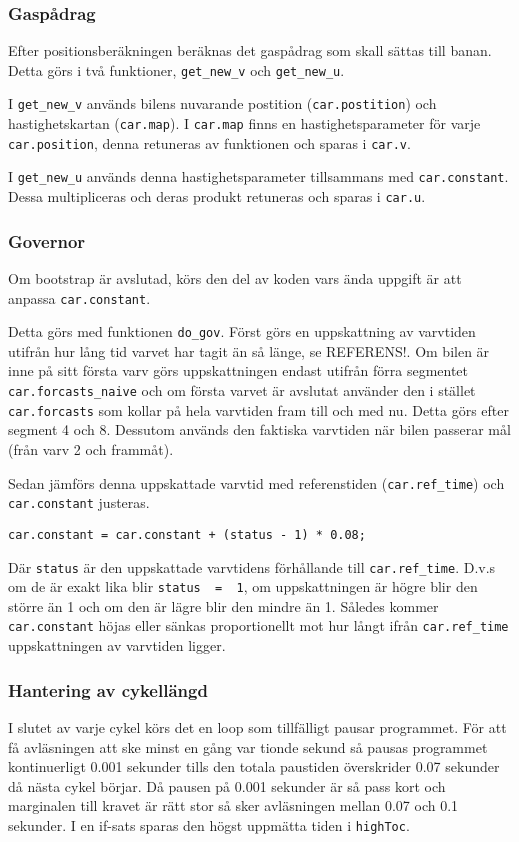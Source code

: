 \subsubsection{Gaspådrag}

Efter positionsberäkningen beräknas det gaspådrag som skall sättas till banan. Detta görs i två
funktioner, \texttt{get\_new\_v} och \texttt{get\_new\_u}.
 
I \texttt{get\_new\_v} används bilens nuvarande postition (\texttt{car.postition})
och hastighetskartan (\texttt{car.map}). I \texttt{car.map} finns en
hastighetsparameter för varje \texttt{car.position}, denna retuneras av funktionen
och sparas i \texttt{car.v}.
 
I \texttt{get\_new\_u} används denna hastighetsparameter tillsammans med
\texttt{car.constant}. Dessa multipliceras och deras produkt retuneras och sparas
i \texttt{car.u}.

\subsubsection{Governor}
\label{sec:systembeskrivning:governor}
Om bootstrap är avslutad, körs den del av koden vars ända uppgift är att 
anpassa \texttt{car.constant}. 

Detta görs med funktionen \texttt{do\_gov}.  Först görs en uppskattning av 
varvtiden utifrån hur lång tid varvet har tagit än
så länge, se REFERENS!. Om bilen är inne på sitt första varv görs uppskattningen endast
utifrån förra segmentet \texttt{car.forcasts\_naive} och om första varvet är
avslutat använder den i stället \texttt{car.forcasts} som kollar på hela varvtiden
fram till och med nu. Detta görs efter segment 4 och 8. Dessutom används den
faktiska varvtiden när bilen passerar mål (från varv 2 och frammåt).
 
Sedan jämförs denna uppskattade varvtid med referenstiden (\texttt{car.ref\_time}) 
och \texttt{car.constant} justeras.
\begin{verbatim}
car.constant = car.constant + (status - 1) * 0.08;
\end{verbatim}
Där \texttt{status} är den uppskattade varvtidens förhållande till \texttt{car.ref\_time}.
D.v.s om de är exakt lika blir \texttt{status~ =~ 1}, om uppskattningen är högre blir
den större än 1 och om den är lägre blir den mindre än 1. Således kommer \texttt{car.constant}
höjas eller sänkas proportionellt mot hur långt ifrån \texttt{car.ref\_time} uppskattningen
av varvtiden ligger. 

\subsubsection{Hantering av cykellängd}
\label{sec:system:korning:cykel}
I slutet av varje cykel körs det en loop som tillfälligt pausar programmet.
För att få avläsningen att ske minst en gång var tionde sekund så pausas
programmet kontinuerligt 0.001 sekunder tills den totala paustiden överskrider 
0.07 sekunder då nästa cykel börjar. Då pausen på 0.001 sekunder är så pass
kort och marginalen till kravet är rätt stor så sker avläsningen mellan
0.07 och 0.1 sekunder. I en if-sats sparas den högst
uppmätta tiden i \texttt{highToc}.